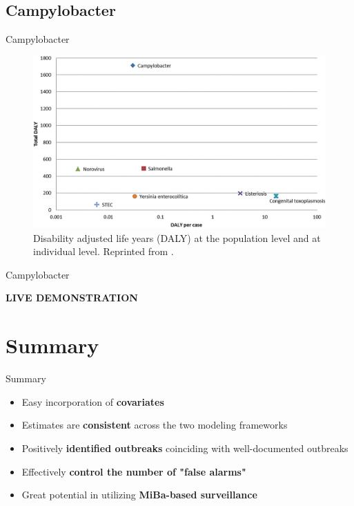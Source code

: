\documentclass[aspectratio=169,handout]{beamer}
\begin{document}
\hypertarget{campylobacter}{%
\subsection{Campylobacter}\label{campylobacter}}

\begin{frame}{Campylobacter}
\tiny

\begin{figure}[H]
\includegraphics[width=0.7\linewidth]{../../figures/DALY} \caption{Disability adjusted life years (DALY) at the population level and at individual level. Reprinted from \cite{Pires_2020}.}\label{fig:DALY}
\end{figure}

\normalsize
\end{frame}

\begin{frame}{Campylobacter}
\protect\hypertarget{campylobacter-1}{}
\center

\huge\textbf{LIVE DEMONSTRATION}
\end{frame}

\hypertarget{summary}{%
\section{Summary}\label{summary}}

\begin{frame}{Summary}
\begin{itemize}
  \item Easy incorporation of \textbf{covariates}
  \item Estimates are \textbf{consistent} across the two modeling frameworks
  \item Positively \textbf{identified outbreaks} coinciding with well-documented outbreaks
  \item Effectively \textbf{control the number of "false alarms"}
  \item Great potential in utilizing \textbf{MiBa-based surveillance}
\end{itemize}
\end{frame}
\end{document}
